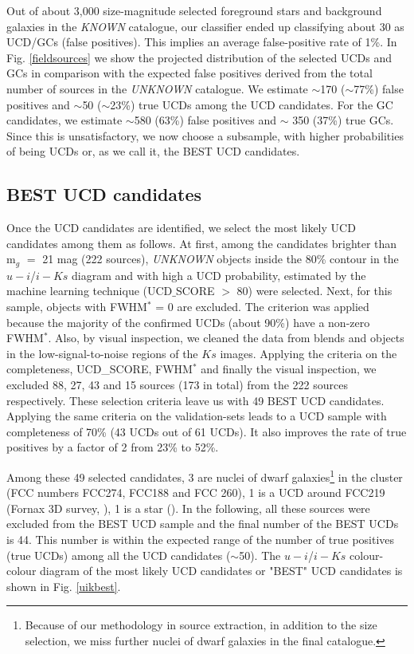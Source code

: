 \documentclass[fleqn,usenatbib]{mnras}
\begin{document}
Out of about 3,000 size-magnitude selected foreground stars and background galaxies in the \textit{KNOWN} catalogue, our classifier ended up classifying about 30 as UCD/GCs (false positives). This implies an average false-positive rate of 1\%. In Fig. \ref{fieldsources} we show the projected distribution of the selected UCDs and GCs in comparison with the expected false positives derived from the total number of sources in the \textit{UNKNOWN} catalogue. We estimate $\sim$170 ($\sim$77\%) false positives and $\sim$50 ($\sim$23\%) true UCDs among the UCD candidates. For the GC candidates, we estimate $\sim$580 (63\%) false positives and $\sim$ 350 (37\%) true GCs. Since this is unsatisfactory, we now choose a subsample, with higher probabilities of being UCDs or, as we call it, the BEST UCD candidates.

\subsection{BEST UCD candidates}

Once the UCD candidates are identified, we select the most likely UCD candidates among them as follows. At first, among the candidates brighter than m$_g$ $=$ 21 mag (222 sources), \textit{UNKNOWN} objects inside the 80\% contour in the $u-i$/$i-Ks$ diagram and with high a UCD probability, estimated by the machine learning technique (UCD$\_$SCORE $>$ 80) were selected. Next, for this sample, objects with FWHM$^*$ = 0 are excluded. The criterion was applied because the majority of the confirmed UCDs (about 90\%) have a non-zero FWHM$^*$. Also, by visual inspection, we cleaned the data from blends and objects in the low-signal-to-noise regions of the $Ks$ images. Applying the criteria on the completeness, UCD\_SCORE, FWHM$^*$ and finally the visual inspection, we excluded 88, 27, 43 and 15 sources (173 in total) from the 222 sources respectively. These selection criteria leave us with 49 BEST UCD candidates. Applying the same criteria on the validation-sets leads to a UCD sample with completeness of 70\% (43 UCDs out of 61 UCDs). It also improves the rate of true positives by a factor of 2 from 23\% to 52\%.

Among these 49 selected candidates, 3 are nuclei of dwarf galaxies\footnote{Because of our methodology in source extraction, in addition to the size selection, we miss further nuclei of dwarf galaxies in the final catalogue.} in the cluster (FCC numbers FCC274, FCC188 and FCC 260), 1 is a UCD around FCC219 (Fornax 3D survey, \citealp{f3d,fahrion4}), 1 is a star (\citealp{schuberth2010}). In the following, all these sources were excluded from the BEST UCD sample and the final number of the BEST UCDs is 44. This number is within the expected range of the number of true positives (true UCDs) among all the UCD candidates ($\sim$50). The $u-i$/$i-Ks$ colour-colour diagram of the most likely UCD candidates or "BEST" UCD candidates is shown in Fig. \ref{uikbest}. 
\end{document}
